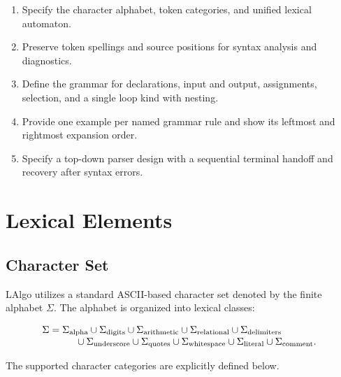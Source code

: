 \documentclass[11pt,a4paper]{article}
\newcommand{\sectionrule}{}
\begin{document}
\begin{enumerate}
  \item Specify the character alphabet, token categories, and unified lexical automaton.
  \item Preserve token spellings and source positions for syntax analysis and diagnostics.
  \item Define the grammar for declarations, input and output, assignments, selection, and a single loop kind with nesting.
  \item Provide one example per named grammar rule and show its leftmost and rightmost expansion order.
  \item Specify a top-down parser design with a sequential terminal handoff and recovery after syntax errors.
\end{enumerate}

\section{Lexical Elements}
\sectionrule

\subsection{Character Set}

LAlgo utilizes a standard ASCII-based character set denoted by the finite alphabet $\Sigma$. The alphabet is organized into lexical classes:

\[
\begin{array}{@{}l}
\Sigma = \Sigma_{\mathrm{alpha}} \cup \Sigma_{\mathrm{digits}} \cup
\Sigma_{\mathrm{arithmetic}} \cup \Sigma_{\mathrm{relational}} \cup
\Sigma_{\mathrm{delimiters}}\\
\hspace{1.2cm}{} \cup \Sigma_{\mathrm{underscore}} \cup
\Sigma_{\mathrm{quotes}} \cup \Sigma_{\mathrm{whitespace}} \cup
\Sigma_{\mathrm{literal}} \cup \Sigma_{\mathrm{comment}}.
\end{array}
\]

The supported character categories are explicitly defined below.
\end{document}
